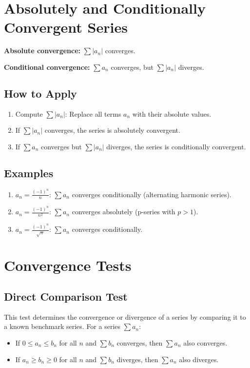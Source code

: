 \documentclass[a4paper, 12pt]{article}
\begin{document}
\section{Absolutely and Conditionally Convergent Series}
\textbf{Absolute convergence:} \(\sum |a_n|\) converges.

\textbf{Conditional convergence:} \(\sum a_n\) converges, but \(\sum |a_n|\) diverges.

\subsection*{How to Apply}
\begin{enumerate}
    \item Compute \(\sum |a_n|\): Replace all terms \(a_n\) with their absolute values.
    \item If \(\sum |a_n|\) converges, the series is absolutely convergent.
    \item If \(\sum a_n\) converges but \(\sum |a_n|\) diverges, the series is conditionally convergent.
\end{enumerate}

\subsection*{Examples}
\begin{enumerate}
    \item \(a_n = \frac{(-1)^n}{n}\):
    \(\sum a_n\) converges conditionally (alternating harmonic series).

    \item \(a_n = \frac{(-1)^n}{n^2}\):
    \(\sum a_n\) converges absolutely (p-series with \(p > 1\)).

    \item \(a_n = \frac{(-1)^n}{\sqrt{n}}\):
    \(\sum a_n\) converges conditionally.
\end{enumerate}

\section{Convergence Tests}

\subsection{Direct Comparison Test}
This test determines the convergence or divergence of a series by comparing it to a known benchmark series. For a series \(\sum a_n\):
\begin{itemize}
    \item If \(0 \leq a_n \leq b_n\) for all \(n\) and \(\sum b_n\) converges, then \(\sum a_n\) also converges.
    \item If \(a_n \geq b_n \geq 0\) for all \(n\) and \(\sum b_n\) diverges, then \(\sum a_n\) also diverges.
\end{itemize}
\end{document}
